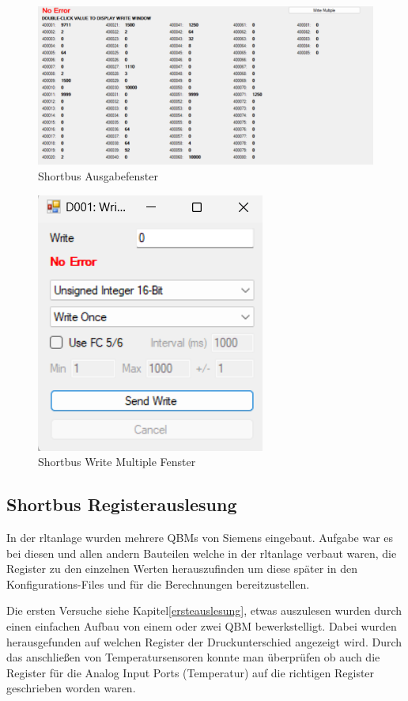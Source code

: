 \begin{figure}[H]
	\centering
	\includegraphics[width=1\linewidth]{Bilder/shortbus_ausgabe}
	\caption{Shortbus Ausgabefenster} 
	\label{fig:Shortbusausgabe}
\end{figure}

\begin{figure}[H]
	\centering
	\includegraphics[width=0.3\linewidth]{Bilder/write_multiple_fenster}
	\caption{Shortbus Write Multiple Fenster} 
	\label{fig:writemultiple}
\end{figure}

\subsection{Shortbus Registerauslesung}

In der \ac{rltanlage} wurden mehrere QBMs von Siemens eingebaut. Aufgabe war es bei diesen und allen andern Bauteilen welche in der \ac{rltanlage} verbaut waren, die Register zu den einzelnen Werten herauszufinden um diese später in den Konfigurations-Files und für die Berechnungen bereitzustellen. 

Die ersten Versuche siehe Kapitel\ref{ersteauslesung}, etwas auszulesen wurden durch einen einfachen Aufbau von einem oder zwei QBM bewerkstelligt. Dabei wurden herausgefunden auf welchen Register der Druckunterschied angezeigt wird. Durch das anschließen von Temperatursensoren konnte man überprüfen ob auch die Register für die Analog Input Ports (Temperatur) auf die richtigen Register geschrieben worden waren.

